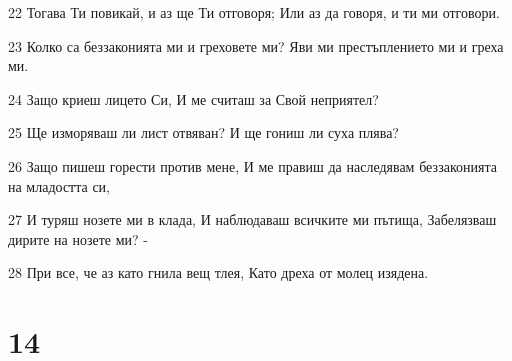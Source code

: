 \par 22 Тогава Ти повикай, и аз ще Ти отговоря; Или аз да говоря, и ти ми отговори.
\par 23 Колко са беззаконията ми и греховете ми? Яви ми престъплението ми и греха ми.
\par 24 Защо криеш лицето Си, И ме считаш за Свой неприятел?
\par 25 Ще изморяваш ли лист отвяван? И ще гониш ли суха плява?
\par 26 Защо пишеш горести против мене, И ме правиш да наследявам беззаконията на младостта си,
\par 27 И туряш нозете ми в клада, И наблюдаваш всичките ми пътища, Забелязваш дирите на нозете ми? -
\par 28 При все, че аз като гнила вещ тлея, Като дреха от молец изядена.

\chapter{14}

